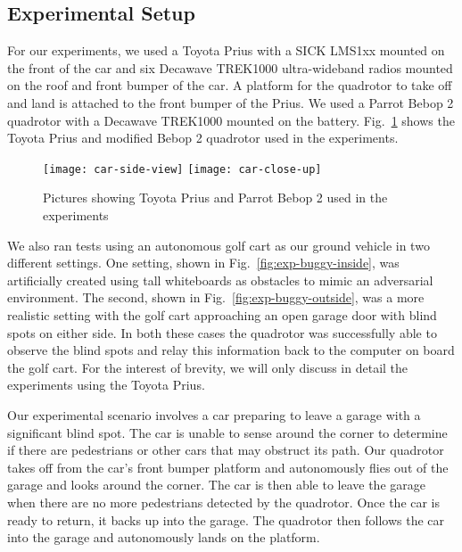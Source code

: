 \subsection{Experimental Setup}

For our experiments, we used a Toyota Prius with a SICK LMS1xx mounted on the
front of the car and six Decawave TREK1000 ultra-wideband radios mounted on the
roof and front bumper of the car. A platform for the quadrotor to take off and
land is attached to the front bumper of the Prius. We used a Parrot Bebop 2
quadrotor with a Decawave TREK1000 mounted on the battery.  Fig.~\ref{fig:car}
shows the Toyota Prius and modified Bebop 2 quadrotor used in the experiments.

\begin{figure}[h!]

    \centering

    \texttt{[image: car-side-view]}
    \texttt{[image: car-close-up]}

    \caption{Pictures showing Toyota Prius and Parrot Bebop 2 used in the
    experiments}

    \label{fig:car}

\end{figure}

We also ran tests using an autonomous golf cart as our ground vehicle in two
different settings.  One setting, shown in Fig.~\ref{fig:exp-buggy-inside}, was
artificially created using tall whiteboards as obstacles to mimic an
adversarial environment. The second, shown in Fig.~\ref{fig:exp-buggy-outside},
was a more realistic setting with the golf cart approaching an open garage door
with blind spots on either side. In both these cases the quadrotor was
successfully able to observe the blind spots and relay this information back to
the computer on board the golf cart. For the interest of brevity, we will only
discuss in detail the experiments using the Toyota Prius.

Our experimental scenario involves a car preparing to leave a garage with a
significant blind spot. The car is unable to sense around the corner to
determine if there are pedestrians or other cars that may obstruct its path.
Our quadrotor takes off from the car's front bumper platform and autonomously
flies out of the garage and looks around the corner. The car is then able to
leave the garage when there are no more pedestrians detected by the quadrotor.
Once the car is ready to return, it backs up into the garage. The quadrotor
then follows the car into the garage and autonomously lands on the platform.

